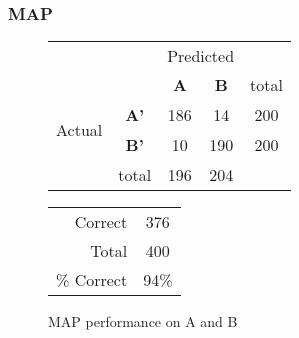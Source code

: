 \clearpage

\subsubsection{MAP}
\begin{figure}[!ht]
\begin{minipage}[b]{0.5\linewidth}
\centering
	\begin{tabular}{ccc|c|c}
	 & &\multicolumn{2}{c}{Predicted} &\\
	  & & \bf{A} &  \bf{B} & total \\
	 \cline{3-5}
	 \multirow{2}{*}{\begin{sideways}Actual\end{sideways}} & \bf{A'}& 186 & 14 & 200 \\
	 \cline{3-5}
	 & \bf{B'}& 10 & 190 & 200 \\
	  \cline{3-5}
	 &total&196&204&\\
	\end{tabular}
\end{minipage}
\hspace{0.5cm}
\begin{minipage}[b]{0.5\linewidth}
	\begin{tabular}{r|c}
	\hline
	Correct& 376\\
	Total& 400\\
	\hline
	\% Correct& 94\%\\
	\hline
	\end{tabular}
\end{minipage}
\vspace{1mm}
\caption{MAP performance on A and B}
\end{figure}


